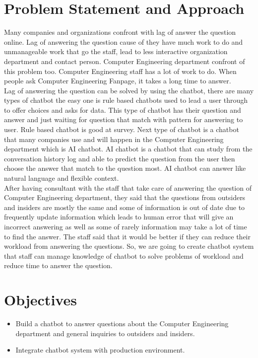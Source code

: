 \documentclass[12pt,oneside,openright,a4paper]{cpe-english-project}
\begin{document}
\section{Problem Statement and Approach} 
Many companies and organizations confront with lag of answer the question online. Lag of answering the question
cause of they have much work to do and unmanageable work that go the staff, lead to less interactive organization
department and contact person. Computer Engineering department confront of this problem too. Computer Engineering
staff has a lot of work to do. When people ask Computer Engineering Fanpage, it takes a long time
to answer.\\
Lag of answering the question can be solved by using the chatbot, there are many types of chatbot the easy one is
rule based chatbots used to lead a user through to offer choices and asks for data. This type of chatbot has their
question and answer and just waiting for question that match with pattern for answering to user. Rule based chatbot
is good at survey. Next type of chatbot is a chatbot that many companies use and will happen in the
Computer Engineering department which is AI chatbot. AI chatbot is a chatbot that can study from the 
conversation history log and able to predict the question from the user then choose the answer that match
to the question most. AI chatbot can answer like natural language and flexible context.\\
After having consultant with the staff that take care of answering the question of Computer
Engineering department, they said that the questions from outsiders and insiders are mostly the same
and some of information is out of date due to frequently update information which leads to human error
that will give an incorrect answering as well as some of rarely information may take a lot of time to find
the answer. The staff said that it would be better if they can reduce their workload from answering the
questions. So, we are going to create chatbot system that staff can manage knowledge of chatbot to solve
problems of workload and reduce time to answer the question.

\section{Objectives}
\begin{itemize}
\item  Build a chatbot to answer questions about the Computer Engineering department and general inquiries to outsiders and insiders.
\item  Integrate chatbot system with production environment.
\end{itemize}
\end{document}
